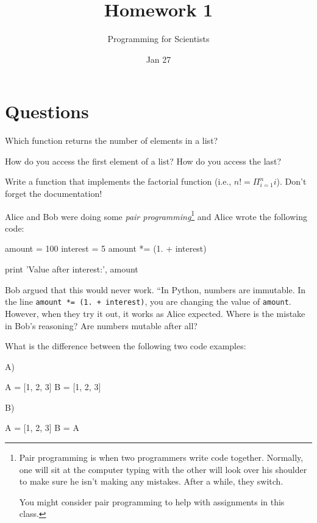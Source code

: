 
\author{Programming for Scientists}
\title{Homework 1}
\date{Jan 27}

\maketitle

\chapter{Questions}

\question
Which function returns the number of elements in a list?

\question
How do you access the first element of a list? How do you access the last?

\question
Write a function that implements the factorial function (i.e., $n! = \Pi_{i=1}^n i$). Don't forget the documentation!


\question
Alice and Bob were doing some \textit{pair programming}\footnote{Pair programming is when two programmers write code together. Normally, one will sit at the computer typing with the other will look over his shoulder to make sure he isn't making any mistakes. After a while, they switch.

You might consider pair programming to help with assignments in this class.} and Alice wrote the following code:

\begin{python}
amount = 100
interest = 5
amount *= (1. + interest)

print 'Value after interest:', amount 
\end{python}

Bob argued that this would never work. ``In Python, numbers are immutable. In the line \lstinline{amount *= (1. + interest)}, you are changing the value of \lstinline{amount}. However, when they try it out, it works as Alice expected. Where is the mistake in Bob's reasoning? Are numbers mutable after all?

\question
What is the difference between the following two code examples:

A)

\begin{python}
A = [1, 2, 3]
B = [1, 2, 3]
\end{python}

B)

\begin{python}
A = [1, 2, 3]
B = A
\end{python}

